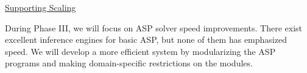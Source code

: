 
\noindent\underline{Supporting Scaling}

During Phase III, we will focus on ASP solver speed improvements.  There exist excellent inference engines for basic ASP, but none of them has emphasized speed.  We will develop a more efficient system by modularizing the ASP programs and making domain-specific restrictions on the modules.  

